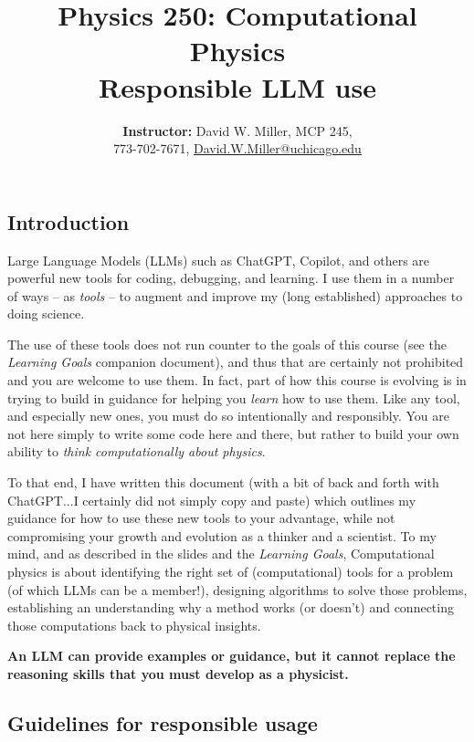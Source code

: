 \documentclass[12pt]{article}
\title{\sc Physics 250: Computational Physics\\Responsible LLM use}
\author{\textbf{Instructor:} David W. Miller, MCP 245, \\ 773-702-7671, \href{mailto:David.W.Miller@uchicago.edu}{David.W.Miller@uchicago.edu}}
\date{}
\begin{document}
\maketitle

\thispagestyle{fancy}


\subsection*{Introduction}

Large Language Models (LLMs) such as ChatGPT, Copilot, and others are powerful new tools for coding, debugging, and learning. I use them in a number of ways -- as \textit{tools} -- to augment and improve my (long established) approaches to doing science. 


The use of these tools does not run counter to the goals of this course (see the \textit{Learning Goals} companion document), and thus that are certainly not prohibited and you are welcome to use them. In fact, part of how this course is evolving is in trying to build in guidance for helping you \textit{learn} how to use them. Like any tool, and especially new ones, you must do so intentionally and responsibly. You are not here simply to write some code here and there, but rather to build your own ability to \textit{think computationally about physics}.

To that end, I have written this document (with a bit of back and forth with ChatGPT...I certainly did not simply copy and paste) which outlines my guidance for how to use these new tools to your advantage, while not compromising your growth and evolution as a thinker and a scientist. To my mind, and as described in the slides and the \textit{Learning Goals}, Computational physics is about identifying the right set of (computational) tools for a problem (of which LLMs can be a member!), designing algorithms to solve those problems, establishing an understanding why a method works (or doesn’t) and connecting those computations back to physical insights.

\textbf{An LLM can provide examples or guidance, but it cannot replace the reasoning skills that you must develop as a physicist.}


\subsection*{Guidelines for responsible usage}
\end{document}
